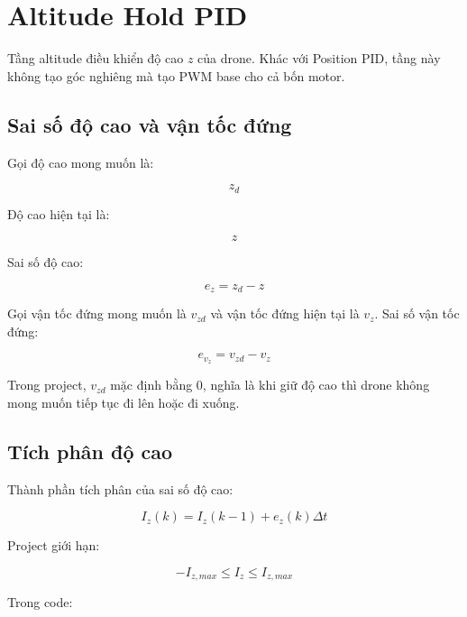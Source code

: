 \section{Altitude Hold PID}

Tầng altitude điều khiển độ cao $z$ của drone. Khác với Position PID, tầng này
không tạo góc nghiêng mà tạo PWM base cho cả bốn motor.

\subsection{Sai số độ cao và vận tốc đứng}

Gọi độ cao mong muốn là:

\begin{equation}
    z_d
\end{equation}

Độ cao hiện tại là:

\begin{equation}
    z
\end{equation}

Sai số độ cao:

\begin{equation}
    e_z = z_d - z
\end{equation}

Gọi vận tốc đứng mong muốn là $v_{zd}$ và vận tốc đứng hiện tại là $v_z$.
Sai số vận tốc đứng:

\begin{equation}
    e_{v_z} = v_{zd} - v_z
\end{equation}

Trong project, $v_{zd}$ mặc định bằng $0$, nghĩa là khi giữ độ cao thì drone
không mong muốn tiếp tục đi lên hoặc đi xuống.

\subsection{Tích phân độ cao}

Thành phần tích phân của sai số độ cao:

\begin{equation}
    I_z(k) = I_z(k-1) + e_z(k)\Delta t
\end{equation}

Project giới hạn:

\begin{equation}
    -I_{z,max} \leq I_z \leq I_{z,max}
\end{equation}

Trong code:

